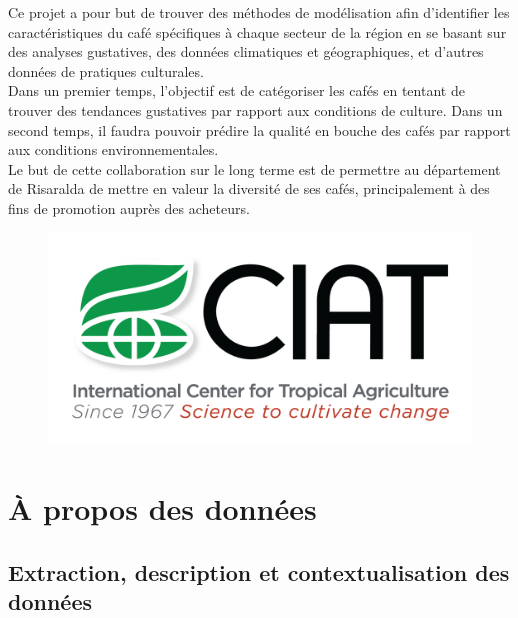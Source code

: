 \noindent Ce projet a pour but de trouver des méthodes de modélisation afin d’identifier les caractéristiques du café spécifiques à chaque secteur de la région en se basant sur des analyses gustatives, des données climatiques et géographiques, et d’autres données de pratiques culturales.\\


\noindent Dans un premier temps, l’objectif est de catégoriser les cafés en tentant de trouver des tendances gustatives par rapport aux conditions de culture. Dans un second temps, il faudra pouvoir prédire la qualité en bouche des cafés par rapport aux conditions environnementales.\\


\noindent Le but de cette collaboration sur le long terme est de permettre au département de Risaralda de mettre en valeur la diversité de ses cafés, principalement à des fins de promotion auprès des acheteurs. \\

\begin{figure}
	\centering
	\includegraphics[width=0.7\linewidth]{img/CIAT_logo_light_PNG/CIAT-Logo-1275x640}
	
	\label{fig:ciat-logo-1275x640}
\end{figure}


\chapter{À propos des données}

\section{Extraction, description et contextualisation des données}

